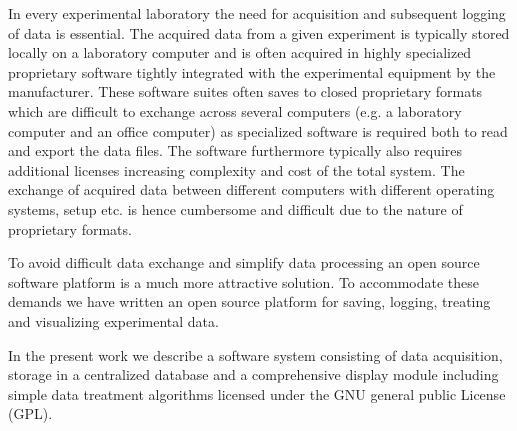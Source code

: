 In every experimental laboratory the need for acquisition and subsequent
logging of data is essential. The acquired data from a given experiment is
typically stored locally on a laboratory computer and is often acquired in
highly specialized proprietary software tightly integrated with the
experimental equipment by the manufacturer. These software suites often saves
to closed proprietary formats which are difficult to exchange across several
computers (e.g. a laboratory computer and an office computer) as specialized
software is required both to read and export the data files. The software
furthermore typically also requires additional licenses increasing complexity
and cost of the total system. The exchange of acquired data between different
computers with different operating systems, setup etc. is hence cumbersome and
difficult due to the nature of proprietary formats.

To avoid difficult data exchange and simplify data processing an open source
software platform is a much more attractive
solution\cite{Benn2009,Murray2011,So2007}. To accommodate these demands we have
written an open source platform for saving, logging, treating and visualizing
experimental data.

In the present work we describe a software system consisting of data
acquisition, storage in a centralized database and a comprehensive display
module including simple data treatment algorithms licensed under the GNU
general public License (GPL).
